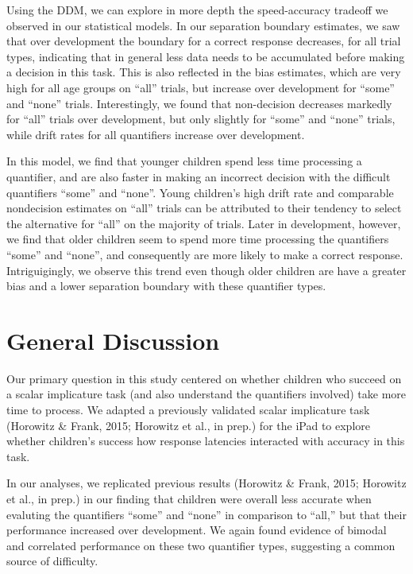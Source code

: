 \documentclass[10pt, letterpaper]{article}
\begin{document}
Using the DDM, we can explore in more depth the speed-accuracy tradeoff
we observed in our statistical models. In our separation boundary
estimates, we saw that over development the boundary for a correct
response decreases, for all trial types, indicating that in general less
data needs to be accumulated before making a decision in this task. This
is also reflected in the bias estimates, which are very high for all age
groups on ``all'' trials, but increase over development for ``some'' and
``none'' trials. Interestingly, we found that non-decision decreases
markedly for ``all'' trials over development, but only slightly for
``some'' and ``none'' trials, while drift rates for all quantifiers
increase over development.

In this model, we find that younger children spend less time processing
a quantifier, and are also faster in making an incorrect decision with
the difficult quantifiers ``some'' and ``none''. Young children's high
drift rate and comparable nondecision estimates on ``all'' trials can be
attributed to their tendency to select the alternative for ``all'' on
the majority of trials. Later in development, however, we find that
older children seem to spend more time processing the quantifiers
``some'' and ``none'', and consequently are more likely to make a
correct response. Intriguigingly, we observe this trend even though
older children are have a greater bias and a lower separation boundary
with these quantifier types.

\section{General Discussion}\label{general-discussion}

Our primary question in this study centered on whether children who
succeed on a scalar implicature task (and also understand the
quantifiers involved) take more time to process. We adapted a previously
validated scalar implicature task (Horowitz \& Frank, 2015; Horowitz et
al., in prep.) for the iPad to explore whether children's success how
response latencies interacted with accuracy in this task.

In our analyses, we replicated previous results (Horowitz \& Frank,
2015; Horowitz et al., in prep.) in our finding that children were
overall less accurate when evaluting the quantifiers ``some'' and
``none'' in comparison to ``all,'' but that their performance increased
over development. We again found evidence of bimodal and correlated
performance on these two quantifier types, suggesting a common source of
difficulty.
\end{document}
